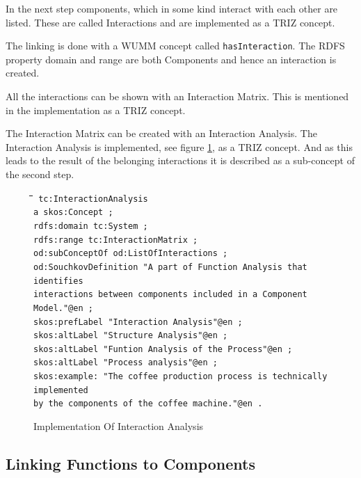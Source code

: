 \documentclass[11pt,a4paper]{article}
\newenvironment{code}{\tt \begin{tabbing}
\hskip12pt\=\hskip12pt\=\hskip12pt\=\hskip12pt\=\hskip5cm\=\hskip5cm\=\kill}
{\end{tabbing}}
\begin{document}
In the next step components, which in some kind interact with each other are
listed.  These are called Interactions and are implemented as a TRIZ concept.

The linking is done with a WUMM concept called \texttt{hasInteraction}.  The
RDFS property domain and range are both Components and hence an interaction is
created.

All the interactions can be shown with an Interaction Matrix.  This is
mentioned in the implementation as a TRIZ concept.

The Interaction Matrix can be created with an Interaction Analysis.  The
Interaction Analysis is implemented, see figure
\ref{fig:implementation_interaction_analysis}, as a TRIZ concept.  And as this
leads to the result of the belonging interactions it is described as a
sub-concept of the second step.

\begin{figure}[ht]
  \centering
  \begin{code}\tt
    tc:InteractionAnalysis\\
    \> a skos:Concept ;\\
    \> rdfs:domain tc:System ;\\
    \> rdfs:range tc:InteractionMatrix ;\\
    \> od:subConceptOf od:ListOfInteractions ;\\
    \> od:SouchkovDefinition "A part of Function Analysis that identifies\\
    \> \> interactions between components included in a Component Model."@en
    ;\\ 
    \> skos:prefLabel "Interaction Analysis"@en ;\\
    \> skos:altLabel "Structure Analysis"@en ;\\
    \> skos:altLabel "Funtion Analysis of the Process"@en ;\\
    \> skos:altLabel "Process analysis"@en ;\\
    \> skos:example: "The coffee production process is technically
    implemented\\ 
    \> \> by the components of the coffee machine."@en .\\
  \end{code}
  \caption{Implementation Of Interaction Analysis}
  \label{fig:implementation_interaction_analysis}
\end{figure}

\subsection{Linking Functions to Components}
\end{document}
